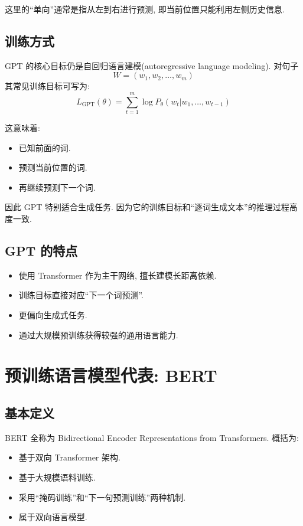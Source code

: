 这里的“单向”通常是指从左到右进行预测,
即当前位置只能利用左侧历史信息.

\subsection{训练方式}


GPT 的核心目标仍是自回归语言建模(autoregressive language modeling).
对句子
\[
W = (w_1, w_2, \dots, w_m)
\]
其常见训练目标可写为:
\[
L_{\operatorname{GPT}}(\theta)
  = \sum_{t=1}^m \log P_{\theta} (w_t | w_1, \dots, w_{t-1})
\]

这意味着:

\begin{itemize}
\item 已知前面的词.
\item 预测当前位置的词.
\item 再继续预测下一个词.
\end{itemize}

因此 GPT 特别适合生成任务.
因为它的训练目标和“逐词生成文本”的推理过程高度一致.

\subsection{GPT 的特点}


\begin{itemize}
\item 使用 Transformer 作为主干网络, 擅长建模长距离依赖.
\item 训练目标直接对应“下一个词预测”.
\item 更偏向生成式任务.
\item 通过大规模预训练获得较强的通用语言能力.
\end{itemize}

\section{预训练语言模型代表: BERT}


\subsection{基本定义}


BERT 全称为 Bidirectional Encoder Representations from Transformers.
概括为:

\begin{itemize}
\item 基于双向 Transformer 架构.
\item 基于大规模语料训练.
\item 采用“掩码训练”和“下一句预测训练”两种机制.
\item 属于双向语言模型.
\end{itemize}

